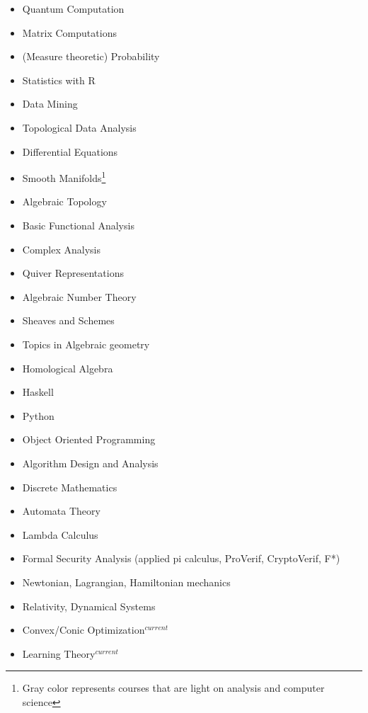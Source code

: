 \begin{multicols}{3}
\begin{itemize}
\setlength\itemsep{-0.5em}
\item Quantum Computation
\item Matrix Computations
\item (Measure theoretic) Probability
\item Statistics with R
\item Data Mining
\item Topological Data Analysis
\item Differential Equations
\item {\color{gray}Smooth Manifolds}\footnote{Gray color represents courses that are light on analysis and computer science}
\item {\color{gray}Algebraic Topology}
\item Basic Functional Analysis
\item Complex Analysis
\item {\color{gray}Quiver Representations}
\item {\color{gray}Algebraic Number Theory}
\item {\color{gray}Sheaves and Schemes}
\item {\color{gray}Topics in Algebraic geometry}
\item {\color{gray}Homological Algebra}
\item Haskell
\item Python
\item Object Oriented Programming
\item Algorithm Design and Analysis
\item Discrete Mathematics
\item Automata Theory
\item Lambda Calculus
\item Formal Security Analysis (applied pi calculus, ProVerif, CryptoVerif, F*)
\item Newtonian, Lagrangian, Hamiltonian mechanics
\item Relativity, Dynamical Systems
\item Convex/Conic Optimization$^{current}$
\item Learning Theory$^{current}$
\end{itemize}
\end{multicols}






